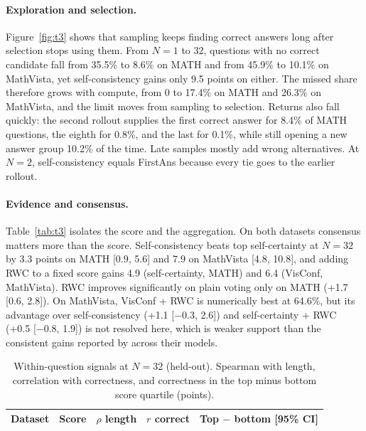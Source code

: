 \documentclass{article}
\begin{document}
\paragraph{Exploration and selection.} Figure~\ref{fig:t3} shows that sampling keeps finding correct answers long after selection stops using them. From $N=1$ to 32, questions with no correct candidate fall from 35.5\% to 8.6\% on MATH and from 45.9\% to 10.1\% on MathVista, yet self-consistency \citep{wang2023selfconsistency} gains only 9.5 points on either. The missed share therefore grows with compute, from 0 to 17.4\% on MATH and 26.3\% on MathVista, and the limit moves from sampling to selection. Returns also fall quickly: the second rollout supplies the first correct answer for 8.4\% of MATH questions, the eighth for 0.8\%, and the last for 0.1\%, while still opening a new answer group 10.2\% of the time. Late samples mostly add wrong alternatives. At $N=2$, self-consistency equals FirstAns because every tie goes to the earlier rollout.

\paragraph{Evidence and consensus.} Table~\ref{tab:t3} isolates the score and the aggregation. On both datasets consensus matters more than the score. Self-consistency beats top self-certainty at $N=32$ by 3.3 points on MATH [0.9, 5.6] and 7.9 on MathVista [4.8, 10.8], and adding RWC to a fixed score gains 4.9 (self-certainty, MATH) and 6.4 (VisConf, MathVista). RWC improves significantly on plain voting only on MATH (+1.7 [0.6, 2.8]). On MathVista, VisConf + RWC is numerically best at 64.6\%, but its advantage over self-consistency (+1.1 [$-$0.3, 2.6]) and self-certainty + RWC (+0.5 [$-$0.8, 1.9]) is not resolved here, which is weaker support than the consistent gains reported by \citet{usman2026visconf} across their models.

\begin{table}[t]
\centering\footnotesize
\caption{Within-question signals at $N=32$ (held-out). Spearman with length, correlation with correctness, and correctness in the top minus bottom score quartile (points).}
\label{tab:t3sig}
\begin{tabular}{llccc}
\toprule
Dataset & Score & $\rho$ length & $r$ correct & Top $-$ bottom [95\% CI] \\
\midrule

\bottomrule
\end{tabular}
\end{table}
\end{document}
